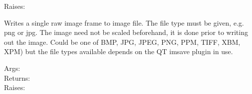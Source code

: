\documentclass[a4paper,10pt,english]{sphinxmanual}
\begin{document}
\begin{fulllineitems}
\begin{description}
\item[{Raises:}] \leavevmode
{}

\end{description}

\end{fulllineitems}


\begin{fulllineitems}
\label{ryfiles:pyradi.ryfiles.rawFrameToImageFile}
Writes a single raw image frame to image file.
The file type must be given, e.g. png or jpg.
The image need not be scaled beforehand, it is done prior 
to writing out the image. Could be one of
BMP, JPG, JPEG, PNG, PPM, TIFF, XBM, XPM)
but the file types available depends
on the QT imsave plugin in use.
\begin{description}
\item[{Args:}] \leavevmode
{}

\item[{Returns:}] \leavevmode
{}

\item[{Raises:}] \leavevmode
{}

\end{description}

\end{fulllineitems}

\end{document}
